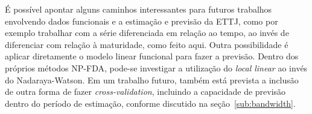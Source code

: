 \documentclass[
	12pt,				%
	openright,			%
	oneside,			%
	a4paper,			%
	english,			%
	brazil				%
	]{dissertacao-ufrgs-abntex2}
\begin{document}
É possível apontar alguns caminhos interessantes para futuros trabalhos envolvendo dados funcionais e a estimação e previsão da ETTJ, como por exemplo trabalhar com a série diferenciada em relação ao tempo, ao invés de diferenciar com relação à maturidade, como feito aqui. Outra possibilidade é aplicar diretamente o modelo linear funcional para fazer a previsão. Dentro dos próprios métodos NP-FDA, pode-se investigar a utilização do \emph{local linear} ao invés do Nadaraya-Watson. Em um trabalho futuro, também está prevista a inclusão de outra forma de fazer \emph{cross-validation}, incluindo a capacidade de previsão dentro do período de estimação, conforme discutido na seção~\ref{sub:bandwidth}. 






%
%

\end{document}
